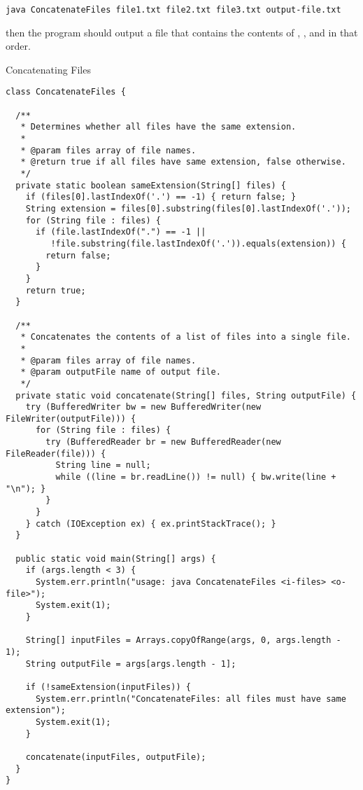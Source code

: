 \par{
\begin{verbatim}
java ConcatenateFiles file1.txt file2.txt file3.txt output-file.txt
\end{verbatim}
}
then the program should output a file  that contains the contents of , , and  in that order. 

\begin{cl}{Concatenating Files}
\begin{lstlisting}[language=MyJava]
class ConcatenateFiles {
 
  /**
   * Determines whether all files have the same extension.
   * 
   * @param files array of file names.
   * @return true if all files have same extension, false otherwise.
   */
  private static boolean sameExtension(String[] files) {
    if (files[0].lastIndexOf('.') == -1) { return false; }
    String extension = files[0].substring(files[0].lastIndexOf('.'));
    for (String file : files) {
      if (file.lastIndexOf(".") == -1 || 
         !file.substring(file.lastIndexOf('.')).equals(extension)) { 
        return false; 
      }
    }
    return true;
  }

  /**
   * Concatenates the contents of a list of files into a single file.
   *
   * @param files array of file names.
   * @param outputFile name of output file.
   */
  private static void concatenate(String[] files, String outputFile) {
    try (BufferedWriter bw = new BufferedWriter(new FileWriter(outputFile))) {
      for (String file : files) {
        try (BufferedReader br = new BufferedReader(new FileReader(file))) {
          String line = null;
          while ((line = br.readLine()) != null) { bw.write(line + "\n"); }
        }
      }
    } catch (IOException ex) { ex.printStackTrace(); }
  }

  public static void main(String[] args) {
    if (args.length < 3) {
      System.err.println("usage: java ConcatenateFiles <i-files> <o-file>");
      System.exit(1);
    }

    String[] inputFiles = Arrays.copyOfRange(args, 0, args.length - 1);
    String outputFile = args[args.length - 1];

    if (!sameExtension(inputFiles)) {
      System.err.println("ConcatenateFiles: all files must have same extension");
      System.exit(1);
    }

    concatenate(inputFiles, outputFile);
  }
}
\end{lstlisting}
\end{cl}



